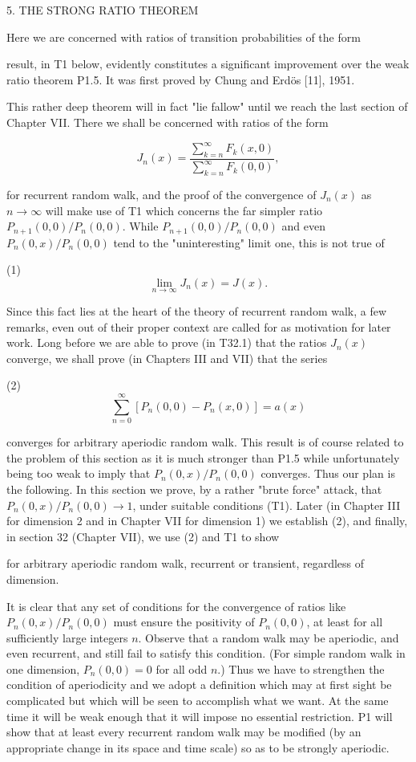 5. THE STRONG RATIO THEOREM

Here we are concerned with ratios of transition probabilities of the form

result, in T1 below, evidently constitutes a significant improvement over the weak ratio theorem P1.5. It was first proved by Chung and Erdös [11], 1951.

This rather deep theorem will in fact "lie fallow" until we reach the last section of Chapter VII. There we shall be concerned with ratios of the form

$$J_n(x) = \frac{\sum_{k=n}^{\infty} F_k(x,0)}{\sum_{k=n}^{\infty} F_k(0,0)},$$

for recurrent random walk, and the proof of the convergence of $J_n(x)$ as $n \to \infty$ will make use of T1 which concerns the far simpler ratio $P_{n+1}(0,0)/P_n(0,0)$. While $P_{n+1}(0,0)/P_n(0,0)$ and even $P_n(0,x)/P_n(0,0)$ tend to the "uninteresting" limit one, this is not true of

(1) $$\lim_{n \to \infty} J_n(x) = J(x).$$

Since this fact lies at the heart of the theory of recurrent random walk, a few remarks, even out of their proper context are called for as motivation for later work. Long before we are able to prove (in T32.1) that the ratios $J_n(x)$ converge, we shall prove (in Chapters III and VII) that the series

(2) $$\sum_{n=0}^{\infty} [P_n(0,0) - P_n(x,0)] = a(x)$$

converges for arbitrary aperiodic random walk. This result is of course related to the problem of this section as it is much stronger than P1.5 while unfortunately being too weak to imply that $P_n(0,x)/P_n(0,0)$ converges. Thus our plan is the following. In this section we prove, by a rather "brute force" attack, that $P_n(0,x)/P_n(0,0) \to 1$, under suitable conditions (T1). Later (in Chapter III for dimension 2 and in Chapter VII for dimension 1) we establish (2), and finally, in section 32 (Chapter VII), we use (2) and T1 to show

for arbitrary aperiodic random walk, recurrent or transient, regardless of dimension.

It is clear that any set of conditions for the convergence of ratios like $P_n(0,x)/P_n(0,0)$ must ensure the positivity of $P_n(0,0)$, at least for all sufficiently large integers $n$. Observe that a random walk may be aperiodic, and even recurrent, and still fail to satisfy this condition. (For simple random walk in one dimension, $P_n(0,0) = 0$ for all odd $n$.) Thus we have to strengthen the condition of aperiodicity and we adopt a definition which may at first sight be complicated but which will be seen to accomplish what we want. At the same time it will be weak enough that it will impose no essential restriction. P1 will show that at least every recurrent random walk may be modified (by an appropriate change in its space and time scale) so as to be strongly aperiodic.